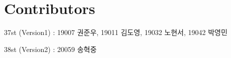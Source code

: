 
\chapter{Contributors}

37st (Version1) : 19007 권준우, 19011 김도영, 19032 노현서, 19042 박영민


38st (Version2) : 20059 송혁중